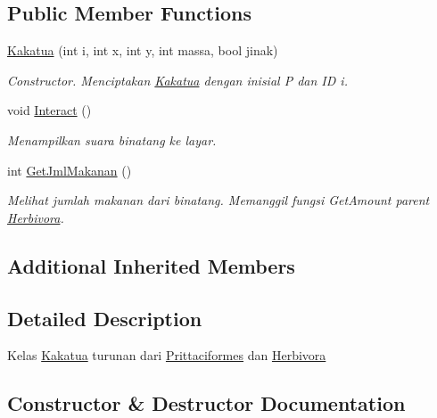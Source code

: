 \subsection*{Public Member Functions}
\begin{DoxyCompactItemize}
\item 
\hyperlink{classKakatua_a7c02844b01c8544fcc0e05d68feb7016}{Kakatua} (int i, int x, int y, int massa, bool jinak)
\begin{DoxyCompactList}\small\item\em Constructor. Menciptakan \hyperlink{classKakatua}{Kakatua} dengan inisial \textquotesingle{}P\textquotesingle{} dan ID i. \end{DoxyCompactList}\item 
void \hyperlink{classKakatua_aa40cd2ef65617dffd716567fe856c0f6}{Interact} ()\hypertarget{classKakatua_aa40cd2ef65617dffd716567fe856c0f6}{}\label{classKakatua_aa40cd2ef65617dffd716567fe856c0f6}

\begin{DoxyCompactList}\small\item\em Menampilkan suara binatang ke layar. \end{DoxyCompactList}\item 
int \hyperlink{classKakatua_a981115d43e229e2516227e9919286133}{Get\+Jml\+Makanan} ()
\begin{DoxyCompactList}\small\item\em Melihat jumlah makanan dari binatang. Memanggil fungsi Get\+Amount parent \hyperlink{classHerbivora}{Herbivora}. \end{DoxyCompactList}\end{DoxyCompactItemize}
\subsection*{Additional Inherited Members}


\subsection{Detailed Description}
Kelas \hyperlink{classKakatua}{Kakatua} turunan dari \hyperlink{classPrittaciformes}{Prittaciformes} dan \hyperlink{classHerbivora}{Herbivora} 

\subsection{Constructor \& Destructor Documentation}
